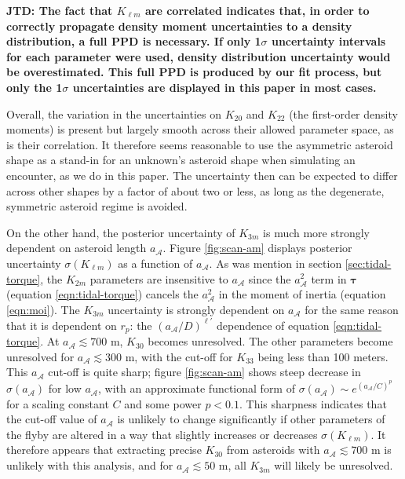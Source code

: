 \documentclass[fleqn,usenatbib]{mnras}
\newcommand{\jtd}[1]{ {\bf{\color{red} JTD: #1}} }
\begin{document}
\jtd{The fact that $K_{\ell m}$ are correlated indicates that, in order to correctly propagate density moment uncertainties to a density distribution, a full PPD is necessary. If only 1$\sigma$ uncertainty intervals for each parameter were used, density distribution uncertainty would be overestimated. This full PPD is produced by our fit process, but only the 1$\sigma$ uncertainties are displayed in this paper in most cases.}

Overall, the variation in the uncertainties on $K_{20}$ and $K_{22}$ (the first-order density moments) is present but largely smooth across their allowed parameter space, as is their correlation. It therefore seems reasonable to use the asymmetric asteroid shape as a stand-in for an unknown's asteroid shape when simulating an encounter, as we do in this paper. The uncertainty then can be expected to differ across other shapes by a factor of about two or less, as long as the degenerate, symmetric asteroid regime is avoided.

On the other hand, the posterior uncertainty of $K_{3m}$ is much more strongly dependent on asteroid length $a_\mathcal{A}$. Figure \ref{fig:scan-am} displays posterior uncertainty $\sigma(K_{\ell m})$ as a function of $a_\mathcal{A}$. As was mention in section \ref{sec:tidal-torque}, the $K_{2m}$ parameters are insensitive to $a_\mathcal{A}$ since the $a_\mathcal{A}^2$ term in $\bm \tau$ (equation \ref{eqn:tidal-torque}) cancels the $a_\mathcal{A}^2$ in the moment of inertia (equation \ref{eqn:moi}). The $K_{3m}$ uncertainty is strongly dependent on $a_\mathcal{A}$ for the same reason that it is dependent on $r_p$: the $(a_\mathcal{A}/D)^{\ell'}$ dependence of equation \ref{eqn:tidal-torque}. At $a_\mathcal{A} \lesssim 700$ m, $K_{30}$ becomes unresolved. The other parameters become unresolved for $a_\mathcal{A} \lesssim 300$ m, with the cut-off for $K_{33}$ being less than 100 meters. This $a_\mathcal{A}$ cut-off is quite sharp; figure \ref{fig:scan-am} shows steep decrease in $\sigma(a_\mathcal{A})$ for low $a_\mathcal{A}$, with an approximate functional form of $\sigma(a_\mathcal{A}) \sim e^{(a_\mathcal{A}/C)^p}$ for a scaling constant $C$ and some power $p < 0.1$. This sharpness indicates that the cut-off value of $a_\mathcal{A}$ is unlikely to change significantly if other parameters of the flyby are altered in a way that slightly increases or decreases $\sigma(K_{\ell m})$. It therefore appears that extracting precise $K_{30}$ from asteroids with $a_\mathcal{A} \lesssim 700$ m is unlikely with this analysis, and for $a_\mathcal{A} \lesssim 50$ m, all $K_{3m}$ will likely be unresolved.
\end{document}
